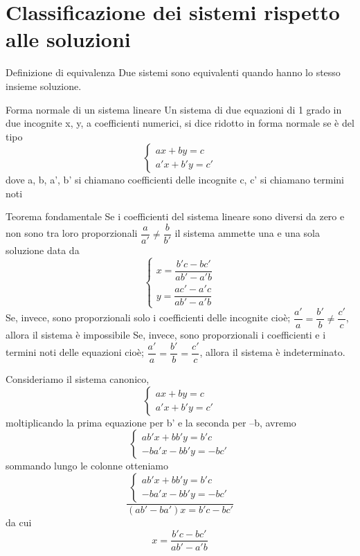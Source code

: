 \section[Classificazione rispetto alle soluzioni]{Classificazione dei sistemi rispetto alle soluzioni}
\begin{definizionet}{Definizione di equivalenza}{}
Due sistemi sono equivalenti quando hanno lo stesso insieme soluzione.
\end{definizionet}
\begin{definizionet}{Forma normale di un sistema lineare}{}
Un sistema di due equazioni di 1 grado in due incognite x, y, a coefficienti numerici, si dice ridotto in forma normale se è del tipo
\[\left\{\begin{array}{l} {ax+by=c} \\ {a'x+b'y=c'}\end{array}\right. \]
dove a, b, a', b' si chiamano coefficienti delle incognite c, c' si chiamano termini noti
\end{definizionet}
\begin{teoremat}{Teorema fondamentale}{}
Se i coefficienti del sistema lineare sono diversi da zero e non sono tra loro proporzionali $\dfrac{a}{a'} \ne \dfrac{b}{b'}$ il sistema ammette una e una sola soluzione data da
\[
\begin{cases}
	x=\dfrac{b'c-bc'}{ab'-a'b}\\
	y=\dfrac{ac'-a'c}{ab'-a'b}
\end{cases}
\]
Se, invece, sono proporzionali solo i coefficienti delle incognite cioè; $\dfrac{a'}{a} =\dfrac{b'}{b} \ne \dfrac{c'}{c} $, allora il sistema è impossibile
Se, invece, sono proporzionali i coefficienti e i termini noti delle equazioni cioè; $\dfrac{a'}{a} =\dfrac{b'}{b} =\dfrac{c'}{c} $, allora il sistema è indeterminato.
\end{teoremat}
Consideriamo il sistema canonico, \[ \left\{\begin{array}{l} {ax+by=c} \\ {a'x+b'y=c'} \end{array}\right. \]
moltiplicando la prima equazione per b' e la seconda per --b, avremo  \[\left\{\begin{array}{l} {ab'x+bb'y=b'c} \\ {-ba'x-bb'y=-bc'} \end{array}\right. \]
sommando lungo le colonne otteniamo \[\dfrac{\left\{\begin{array}{l} {ab'x+bb'y=b'c} \\ {-ba'x-bb'y=-bc'} \end{array}\right. }{\left(ab'-ba'\right)x=b'c-bc'} \]  da cui  \[x=\dfrac{b'c-bc'}{ab'-a'b} \]
